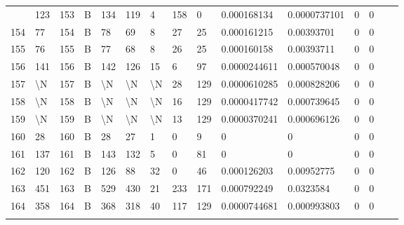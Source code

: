 \begin{longtable}{lllllllllllllll}
\begin{comment}
	153 & 123               & 153 & B   & 134               & 119               & 4                 & 158  & 0          & 0.000168134    & 0.0000737101   & 0             & 0            \\
	154 & 77                & 154 & B   & 78                & 69                & 8                 & 27   & 25         & 0.000161215    & 0.00393701     & 0             & 0            \\
	155 & 76                & 155 & B   & 77                & 68                & 8                 & 26   & 25         & 0.000160158    & 0.00393711     & 0             & 0            \\
	156 & 141               & 156 & B   & 142               & 126               & 15                & 6    & 97         & 0.0000244611   & 0.000570048    & 0             & 0            \\
	157 & \textbackslash{}N & 157 & B   & \textbackslash{}N & \textbackslash{}N & \textbackslash{}N & 28   & 129        & 0.0000610285   & 0.000828206    & 0             & 0            \\
	158 & \textbackslash{}N & 158 & B   & \textbackslash{}N & \textbackslash{}N & \textbackslash{}N & 16   & 129        & 0.0000417742   & 0.000739645    & 0             & 0            \\
	159 & \textbackslash{}N & 159 & B   & \textbackslash{}N & \textbackslash{}N & \textbackslash{}N & 13   & 129        & 0.0000370241   & 0.000696126    & 0             & 0            \\
	160 & 28                & 160 & B   & 28                & 27                & 1                 & 0    & 9          & 0              & 0              & 0             & 0            \\
	161 & 137               & 161 & B   & 143               & 132               & 5                 & 0    & 81         & 0              & 0              & 0             & 0            \\
	162 & 120               & 162 & B   & 126               & 88                & 32                & 0    & 46         & 0.000126203    & 0.00952775     & 0             & 0            \\
	163 & 451               & 163 & B   & 529               & 430               & 21                & 233  & 171        & 0.000792249    & 0.0323584      & 0             & 0            \\
	164 & 358               & 164 & B   & 368               & 318               & 40                & 117  & 129        & 0.0000744681   & 0.000993803    & 0             & 0            \\

\end{comment}
\end{longtable}
